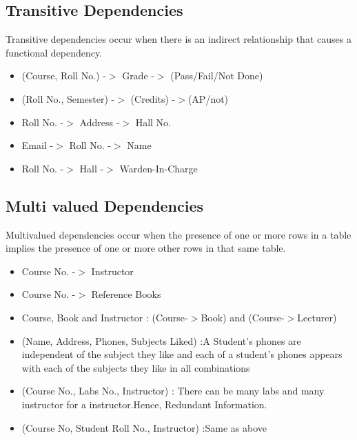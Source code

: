 \documentclass[a4paper]{article}
\begin{document}
\subsection{Transitive Dependencies}
Transitive dependencies occur when there is an indirect relationship that causes a functional dependency.
\begin{itemize}
\item (Course, Roll No.) -$>$ Grade -$>$ (Pass/Fail/Not Done)
\item (Roll No., Semester) -$>$ (Credits) -$>$(AP/not)
\item Roll No. -$>$ Address -$>$ Hall No.
\item Email -$>$ Roll No. -$>$ Name
\item Roll No. -$>$ Hall -$>$ Warden-In-Charge
\end{itemize}

\subsection{Multi valued Dependencies}
Multivalued dependencies occur when the presence of one or more rows in a table implies the presence of one or more other rows in that same table. 
\begin{itemize}
\item Course No. -$>$ Instructor
\item Course No. -$>$ Reference Books
\item Course, Book and Instructor : (Course-$>$Book) and (Course-$>$Lecturer)
\item (Name, Address, Phones, Subjects Liked) :A Student’s phones are independent of
the subject they like and each of a student’s phones appears with each of the subjects they like in all combinations
\item (Course No., Labs No., Instructor) : There can be many labs and many instructor for a instructor.Hence, Redundant Information.
\item (Course No, Student Roll No., Instructor) :Same as above

\end{itemize}
\end{document}
